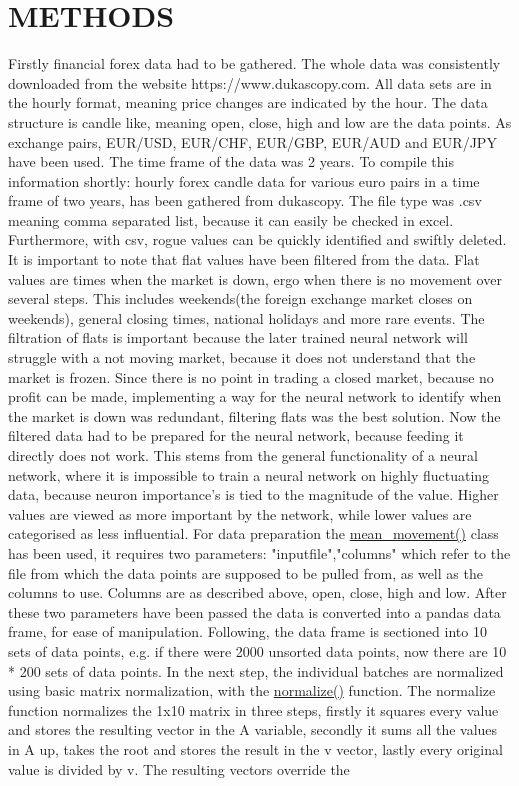 \documentclass{article}
\begin{document}
\section{METHODS}
Firstly financial forex data had to be gathered. The whole data was consistently downloaded from the website https://www.dukascopy.com. All data sets are in the hourly format, meaning price changes are indicated by the hour. The data structure is candle like, meaning open, close, high and low are the data points. As exchange pairs, EUR/USD, EUR/CHF, EUR/GBP, EUR/AUD and EUR/JPY have been used. The time frame of the data was 2 years. To compile this information shortly: hourly forex candle data for various euro pairs in a time frame of two years, has been gathered from dukascopy. The file type was .csv meaning comma separated list, because it can easily be checked in excel. Furthermore, with csv, rogue values can be quickly identified and swiftly deleted. It is important to note that flat values have been filtered from the data. Flat values are times when the market is down, ergo when there is no movement over several steps. This includes weekends(the foreign exchange market closes on weekends), general closing times, national holidays and more rare events. The filtration of flats is important because the later trained neural network will struggle with a not moving market, because it does not understand that the market is frozen. Since there is no point in trading a closed market, because no profit can be made, implementing a way for the neural network to identify when the market is down was redundant, filtering flats was the best solution. Now the filtered data had to be prepared for the neural network, because feeding it directly does not work. This stems from the general functionality of a neural network, where it is impossible to train a neural network on highly fluctuating data, because neuron importance's is tied to the magnitude of the value. Higher values are viewed as more important by the network, while lower values are categorised as less influential. For data preparation the \href{https://colab.research.google.com/drive/1KucTlScag3R0D2piUODHtQ1eAmDSQ2Rv#scrollTo=9AWlOIJSpKvO}{mean\_movement()} class has been used, it requires two parameters: "inputfile","columns" which refer to the file from which the data points are supposed to be pulled from, as well as the columns to use. Columns are as described above, open, close, high and low. After these two parameters have been passed the data is converted into a pandas data frame, for ease of manipulation. Following, the data frame is sectioned into 10 sets of data points, e.g. if there were 2000 unsorted data points, now there are 10 * 200 sets of data points. In the next step, the individual batches are normalized using basic matrix normalization, with the \href{https://colab.research.google.com/drive/1KucTlScag3R0D2piUODHtQ1eAmDSQ2Rv#scrollTo=gcF9CM1Tuaib}{normalize()} function. The normalize function normalizes the 1x10 matrix in three steps, firstly it squares every value and stores the resulting vector in the A variable, secondly it sums all the values in A up, takes the root and stores the result in the v vector, lastly every original value is divided by v. The resulting vectors override the 
\end{document}
